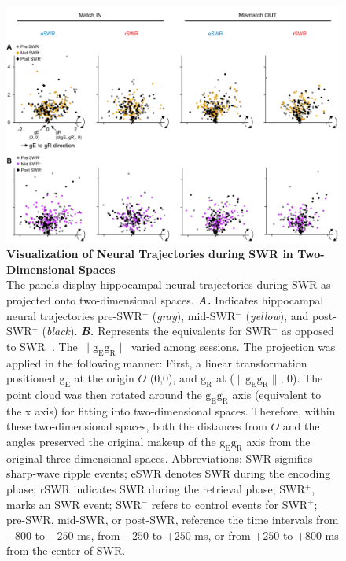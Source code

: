 \documentclass[final,3p,times,twocolumn]{elsarticle}
\begin{document}
        \begin{figure}[ht]
        	\centering
            \includegraphics[width=1\textwidth]{./src/figures/.png/Figure_ID_06.png}
        	\caption{\textbf{
Visualization of Neural Trajectories during SWR in Two-Dimensional Spaces}
\smallskip
\\
The panels display hippocampal neural trajectories during SWR as projected onto two-dimensional spaces. \textbf{\textit{A.}} Indicates hippocampal neural trajectories pre-SWR$^-$ (\textit{gray}), mid-SWR$^-$ (\textit{yellow}), and post-SWR$^-$ (\textit{black}). \textbf{\textit{B.}} Represents the equivalents for SWR$^+$ as opposed to SWR$^-$. The $\lVert \mathrm{g_{E}g_{R}} \rVert$ varied among sessions. The projection was applied in the following manner: First, a linear transformation positioned $\mathrm{g_{E}}$ at the origin $O$ (0,0), and $\mathrm{g_{R}}$ at ($\lVert \mathrm{g_{E}g_{R}} \rVert$, 0). The point cloud was then rotated around the $\mathrm{g_{E}g_{R}}$ axis (equivalent to the x axis) for fitting into two-dimensional spaces. Therefore, within these two-dimensional spaces, both the distances from $O$ and the angles preserved the original makeup of the $\mathrm{g_{E}g_{R}}$ axis from the original three-dimensional spaces. Abbreviations: SWR signifies sharp-wave ripple events; eSWR denotes SWR during the encoding phase; rSWR indicates SWR during the retrieval phase; SWR$^+$, marks an SWR event; SWR$^-$ refers to control events for SWR$^+$; pre-SWR, mid-SWR, or post-SWR, reference the time intervals from $-800$ to $-250$ ms, from $-250$ to $+250$ ms, or from $+250$ to $+800$ ms from the center of SWR.
}
        	\label{fig:06}
        \end{figure}
\end{document}
